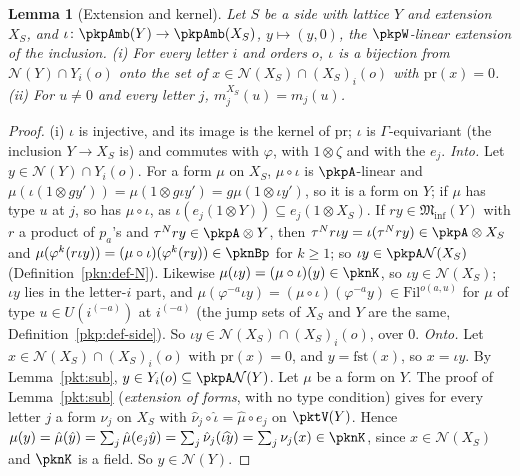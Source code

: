 \documentclass[10pt]{amsart}
\newtheorem{lemma}[theorem]{Lemma}
\theoremstyle{definition}
\theoremstyle{remark}
\begin{document}
\begin{lemma}[Extension and kernel]\label{pkh:kernel}
Let $S$ be a side with lattice $Y$ and extension $X_S$, and $\iota\colon\pkpAmb(Y)\to\pkpAmb(X_S)$, $y\mapsto
(y,0)$, the $\pkpW$-linear extension of the inclusion. (i) For every letter $i$ and orders $o$, $\iota$ is a
bijection from $\mathcal N(Y)\cap Y_i(o)$ onto the set of $x\in\mathcal N(X_S)\cap(X_S)_i(o)$ with
$\mathrm{pr}(x)=0$. (ii) For $u\ne0$ and every letter $j$, $m^{X_S}_j(u)=m_j(u)$.
\end{lemma}

\begin{proof}
(i) $\iota$ is injective, and its image is the kernel of $\mathrm{pr}$; $\iota$ is $\Gamma$-equivariant (the
inclusion $Y\to X_S$ is) and commutes with $\varphi$, with $1\otimes\zeta$ and with the $e_j$.
\emph{Into.} Let $y\in\mathcal N(Y)\cap Y_i(o)$. For a form $\mu$ on $X_S$, $\mu\circ\iota$ is
$\pkpA$-linear and $\mu(\iota(1\otimes gy'))=\mu(1\otimes g\iota y')=g\mu(1\otimes\iota y')$, so it is a form
on $Y$; if $\mu$ has type $u$ at $j$, so has $\mu\circ\iota$, as $\iota(e_j(1\otimes Y))\subseteq
e_j(1\otimes X_S)$. If $ry\in\mathfrak M_{\mathrm{inf}}(Y)$ with $r$ a product of $p_a$'s and $\tau^Nry\in
\pkpA\otimes Y$, then $\tau^Nr\iota y=\iota(\tau^Nry)\in\pkpA\otimes X_S$ and $\mu(\varphi^k(r\iota
y))=(\mu\circ\iota)(\varphi^k(ry))\in\pknBp$ for $k\ge1$; so $\iota y\in\pkpA\mathcal N(X_S)$
(Definition~\ref{pkn:def-N}). Likewise $\mu(\iota y)=(\mu\circ\iota)(y)\in\pknK$, so $\iota y\in\mathcal N(X_S)$;
$\iota y$ lies in the letter-$i$ part, and $\mu(\varphi^{-a}\iota y)=(\mu\circ\iota)(\varphi^{-a}y)\in
\mathrm{Fil}^{o(a,u)}$ for $\mu$ of type $u\in U(i^{(-a)})$ at $i^{(-a)}$ (the jump sets of $X_S$ and $Y$ are
the same, Definition~\ref{pkp:def-side}). So $\iota y\in\mathcal N(X_S)\cap(X_S)_i(o)$, over $0$.
\emph{Onto.} Let $x\in\mathcal N(X_S)\cap(X_S)_i(o)$ with $\mathrm{pr}(x)=0$, and $y=\mathrm{fst}(x)$, so
$x=\iota y$. By Lemma~\ref{pkt:sub}, $y\in Y_i(o)\subseteq\pkpA\mathcal N(Y)$. Let $\mu$ be a form on $Y$. The
proof of Lemma~\ref{pkt:sub} (\emph{extension of forms}, with no type condition) gives for every letter $j$ a
form $\nu_j$ on $X_S$ with $\hat\nu_j\circ\hat\iota=\hat\mu\circ e_j$ on $\pktV(Y)$. Hence
$\mu(y)=\hat\mu(\hat y)=\sum_j\hat\mu(e_j\hat y)=\sum_j\hat\nu_j(\widehat{\iota y})=\sum_j\nu_j(x)\in\pknK$,
since $x\in\mathcal N(X_S)$ and $\pknK$ is a field. So $y\in\mathcal N(Y)$.


\end{proof}
\end{document}
